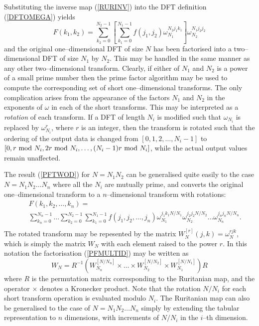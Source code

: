 \documentclass[dvips]{article}
\begin{document}
Substituting the inverse map
(\ref{RURINV}) into the DFT definition (\ref{DFTOMEGA}) yields
\begin{equation}
F(k_{1},k_{2}) = \sum_{k_{2}=0}^{N_{2}-1}
\left[
\sum_{k_{1}=0}^{N_{1}-1}f(j_{1},j_{2})\omega_{N_{1}}^{N_{2}j_{1}k_{1}}
\right]
\omega_{N_{2}}^{N_{1}j_{2}j_{2}}
\label{PFTWOD}
\end{equation}
and the original one--dimensional DFT of size $N$ has been factorised
into a two--dimensional DFT of size $N_{1}$ by $N_{2}$.  This may be
handled in the same manner as any other two--dimensional transform.
Clearly, if either
of $N_{1}$ and $N_{2}$ is a power of a small prime number then the
prime factor algorithm may be used to compute the corresponding set of
short one--dimensional transforms.  The only
complication arises from the appearance of the factors $N_{1}$ and
$N_{2}$ in the exponents of $\omega$ in each of the short transforms.
This may be interpreted as a {\it rotation} of each transform.  If a DFT of
length $N_{i}$ is modified such that $\omega_{N_{i}}$ is replaced
by $\omega_{N_{i}}^{r}$, where $r$ is an integer, then the transform is 
rotated such that the ordering of the output data
is changed from $[0,1,2,\ldots ,N_{i}-1]$ to $[0,r\ {\rm mod}\ N_{i}, 2r\
{\rm mod}\ N_{i},\ldots ,(N_{i}-1)r\ {\rm mod}\ N_{i}]$, while the actual
output values remain unaffected.

The result (\ref{PFTWOD}) for $N=N_{1}N_{2}$ can be
generalised quite easily to the case $N=N_{1}N_{2}\ldots N_{n}$ where all
the $N_{i}$ are mutually prime, and converts the original
one--dimensional transform to a $n$--dimensional transform with
rotations: 
\begin{eqnarray}
& & F(k_{1},k_{2},\ldots ,k_{n}) = \nonumber\\ & &
\sum_{k_{n}=0}^{N_{n}-1}\ldots
\sum_{k_{2}=0}^{N_{2}-1}
\sum_{k_{1}=0}^{N_{1}-1}
f(j_{1},j_{2},\ldots ,j_{n})
\omega_{N_{1}}^{j_{1}k_{1}N/N_{1}}
\omega_{N_{2}}^{j_{2}j_{2}N/N_{2}}\ldots
\omega_{N_{n}}^{j_{n}j_{n}N/N_{n}}.\nonumber \\
\label{PFMULTID}
\end{eqnarray}
The rotated transform may be repesented by the matrix
$W_{N}^{[r]}(j,k) = \omega_{N}^{rjk}$, which is simply the matrix $W_{N}$
with each element raised to the power $r$.  In this notation the
factorisation (\ref{PFMULTID}) may be written as
\[
W_{N} = R^{-1}\left(W_{N_{n}}^{[N/N_{n}]}\times\ldots\times
W_{N_{2}}^{[N/N_{2}]}\times W_{N_{1}}^{[N/N_{1}]}\right)R
\]
where $R$ is the permutation matrix corresponding to the Ruritanian map,
and the operator $\times$ denotes a Kronecker product.  Note that the
rotation $N/N_{i}$ for each short transform operation is evaluated
modulo $N_{i}$.
The Ruritanian map can also be generalised to the case of $N=N_{1}N_{2}\ldots
N_{n}$ simply by extending the tabular representation to $n$ dimensions,
with increments of $N/N_{i}$ in the $i$--th dimension.  
\end{document}
